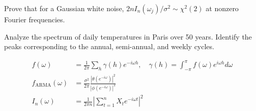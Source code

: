 \begin{exercise}[$\star\star$]
Prove that for a Gaussian white noise, $2nI_n(\omega_j)/\sigma^2\sim\chi^2(2)$ at nonzero Fourier frequencies.
\end{exercise}

\begin{exercise}
Analyze the spectrum of daily temperatures in Paris over 50 years. Identify the peaks corresponding to the annual, semi-annual, and weekly cycles.
\end{exercise}

\begin{keyformulas}
\begin{align*}
f(\omega) &= \frac{1}{2\pi}\sum_{h}\gamma(h)e^{-i\omega h}, \quad \gamma(h)=\int_{-\pi}^{\pi}f(\omega)e^{i\omega h}d\omega \\
f_{\text{ARMA}}(\omega) &= \frac{\sigma^2}{2\pi}\frac{|\theta(e^{-i\omega})|^2}{|\phi(e^{-i\omega})|^2} \\
I_n(\omega) &= \frac{1}{2\pi n}\left|\sum_{t=1}^n X_t e^{-i\omega t}\right|^2
\end{align*}
\end{keyformulas}
